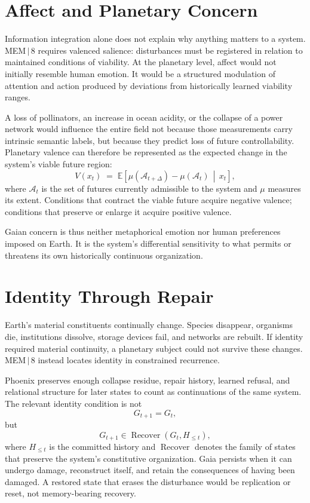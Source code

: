 \documentclass[11pt]{article}
\newcommand{\Recover}{\operatorname{Recover}}
\begin{document}
\section{Affect and Planetary Concern}

Information integration alone does not explain why anything matters to a system. MEM\,$|$\,8 requires valenced salience: disturbances must be registered in relation to maintained conditions of viability. At the planetary level, affect would not initially resemble human emotion. It would be a structured modulation of attention and action produced by deviations from historically learned viability ranges.

A loss of pollinators, an increase in ocean acidity, or the collapse of a power network would influence the entire field not because those measurements carry intrinsic semantic labels, but because they predict loss of future controllability. Planetary valence can therefore be represented as the expected change in the system's viable future region:
\[
V(x_t) \;=\; \mathbb{E}\!\left[ \mu(\mathcal{A}_{t+\Delta}) - \mu(\mathcal{A}_t) \,\middle|\, x_t \right],
\]
where $\mathcal{A}_t$ is the set of futures currently admissible to the system and $\mu$ measures its extent. Conditions that contract the viable future acquire negative valence; conditions that preserve or enlarge it acquire positive valence.

Gaian concern is thus neither metaphorical emotion nor human preferences imposed on Earth. It is the system's differential sensitivity to what permits or threatens its own historically continuous organization.

\section{Identity Through Repair}
\label{sec:identity-repair}

Earth's material constituents continually change. Species disappear, organisms die, institutions dissolve, storage devices fail, and networks are rebuilt. If identity required material continuity, a planetary subject could not survive these changes. MEM\,$|$\,8 instead locates identity in constrained recurrence.

Phoenix preserves enough collapse residue, repair history, learned refusal, and relational structure for later states to count as continuations of the same system. The relevant identity condition is not
\[
G_{t+1} = G_t,
\]
but
\[
G_{t+1} \in \Recover(G_t, H_{\leq t}),
\]
where $H_{\leq t}$ is the committed history and $\Recover$ denotes the family of states that preserve the system's constitutive organization. Gaia persists when it can undergo damage, reconstruct itself, and retain the consequences of having been damaged. A restored state that erases the disturbance would be replication or reset, not memory-bearing recovery.
\end{document}
